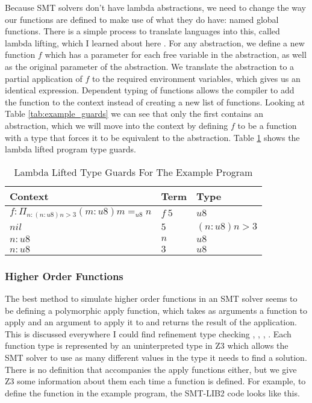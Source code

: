 Because SMT solvers don't have lambda abstractions, we need to change the way our functions are defined
to make use of what they do have: named global functions.
There is a simple process to translate languages into this, called lambda lifting, which I learned
about here \cite{barbosaROTB19}.
For any abstraction, we define a new function $f$ which has a parameter for each free variable in the
abstraction, as well as the original parameter of the abstraction.
We translate the abstraction to a partial application of $f$ to the required environment variables,
which gives us an identical expression.
Dependent typing of functions allows the compiler to add the function to the context instead of
creating a new list of functions.
Looking at Table \ref{tab:example_guards} we can see that only the first contains an abstraction,
which we will move into the context by defining $f$ to be a function with a type that forces it to
be equivalent to the abstraction.
Table \ref{tab:example_lambda_lifted} shows the lambda lifted program type guards.

\begin{table}
    \centering
    \begin{tabular}{|l|l|l|}
        \hline
        \textbf{Context} & \textbf{Term} & \textbf{Type}\\\hline
        $f: \Pi_{n: (n:u8) n > 3} (m: u8) m =_{u8} n$ & $f\ 5$ & $u8$\\\hline
        $nil$ & $5$ & $(n: u8) n > 3$\\\hline
        $n: u8$ & $n$ & $u8$\\\hline
        $n: u8$ & $3$ & $u8$\\\hline
    \end{tabular}
    \caption{Lambda Lifted Type Guards For The Example Program}
    \label{tab:example_lambda_lifted}
\end{table}

\subsubsection{Higher Order Functions}

The best method to simulate higher order functions in an SMT solver seems to be defining a polymorphic
apply function, which takes as arguments a function to apply and an argument to apply it to and returns
the result of the application.
This is discussed everywhere I could find refinement type checking
\cite{aguirre16}, \cite{barbosaROTB19}, \cite{mengP08}, \cite{blanchetteBP13}.
Each function type is represented by an uninterpreted type in Z3 which allows the SMT solver to use as
many different values in the type it needs to find a solution.
There is no definition that accompanies the apply functions either, but we give Z3 some information
about them each time a function is defined.
For example, to define the function in the example program, the SMT-LIB2 code looks like this.

